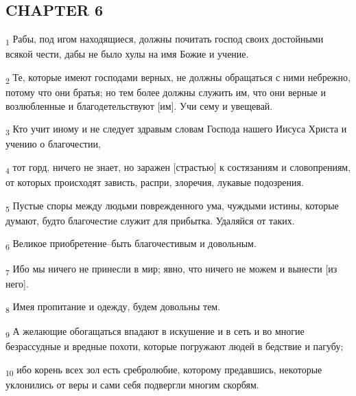 \subsection{CHAPTER 6}
\begin{tcolorbox}
\textsubscript{1} Рабы, под игом находящиеся, должны почитать господ своих достойными всякой чести, дабы не было хулы на имя Божие и учение.
\end{tcolorbox}
\begin{tcolorbox}
\textsubscript{2} Те, которые имеют господами верных, не должны обращаться с ними небрежно, потому что они братья; но тем более должны служить им, что они верные и возлюбленные и благодетельствуют [им]. Учи сему и увещевай.
\end{tcolorbox}
\begin{tcolorbox}
\textsubscript{3} Кто учит иному и не следует здравым словам Господа нашего Иисуса Христа и учению о благочестии,
\end{tcolorbox}
\begin{tcolorbox}
\textsubscript{4} тот горд, ничего не знает, но заражен [страстью] к состязаниям и словопрениям, от которых происходят зависть, распри, злоречия, лукавые подозрения.
\end{tcolorbox}
\begin{tcolorbox}
\textsubscript{5} Пустые споры между людьми поврежденного ума, чуждыми истины, которые думают, будто благочестие служит для прибытка. Удаляйся от таких.
\end{tcolorbox}
\begin{tcolorbox}
\textsubscript{6} Великое приобретение--быть благочестивым и довольным.
\end{tcolorbox}
\begin{tcolorbox}
\textsubscript{7} Ибо мы ничего не принесли в мир; явно, что ничего не можем и вынести [из него].
\end{tcolorbox}
\begin{tcolorbox}
\textsubscript{8} Имея пропитание и одежду, будем довольны тем.
\end{tcolorbox}
\begin{tcolorbox}
\textsubscript{9} А желающие обогащаться впадают в искушение и в сеть и во многие безрассудные и вредные похоти, которые погружают людей в бедствие и пагубу;
\end{tcolorbox}
\begin{tcolorbox}
\textsubscript{10} ибо корень всех зол есть сребролюбие, которому предавшись, некоторые уклонились от веры и сами себя подвергли многим скорбям.
\end{tcolorbox}

